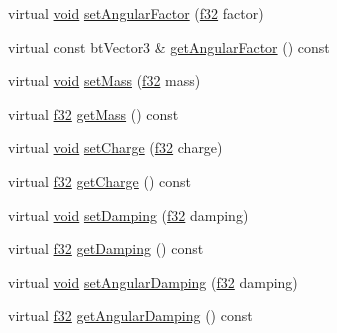 \begin{DoxyCompactItemize}
\item 
virtual \mbox{\hyperlink{_thread_8h_af1e856da2e658414cb2456cb6f7ebc66}{void}} \mbox{\hyperlink{classnjli_1_1_physics_body_rigid_a20c0ae6e0bc489646c4d3206fdda2662}{set\+Angular\+Factor}} (\mbox{\hyperlink{_util_8h_a5f6906312a689f27d70e9d086649d3fd}{f32}} factor)
\item 
virtual const bt\+Vector3 \& \mbox{\hyperlink{classnjli_1_1_physics_body_rigid_a2c2f3087ebc43b32ceb3fdb13935fcca}{get\+Angular\+Factor}} () const
\item 
virtual \mbox{\hyperlink{_thread_8h_af1e856da2e658414cb2456cb6f7ebc66}{void}} \mbox{\hyperlink{classnjli_1_1_physics_body_rigid_a1c8b45c013666e4cd575fc6e3c6db031}{set\+Mass}} (\mbox{\hyperlink{_util_8h_a5f6906312a689f27d70e9d086649d3fd}{f32}} mass)
\item 
virtual \mbox{\hyperlink{_util_8h_a5f6906312a689f27d70e9d086649d3fd}{f32}} \mbox{\hyperlink{classnjli_1_1_physics_body_rigid_a91e536e02eac21b097654263c6298f1b}{get\+Mass}} () const
\item 
virtual \mbox{\hyperlink{_thread_8h_af1e856da2e658414cb2456cb6f7ebc66}{void}} \mbox{\hyperlink{classnjli_1_1_physics_body_rigid_a620b7e704797642da0594762ff24a0b8}{set\+Charge}} (\mbox{\hyperlink{_util_8h_a5f6906312a689f27d70e9d086649d3fd}{f32}} charge)
\item 
virtual \mbox{\hyperlink{_util_8h_a5f6906312a689f27d70e9d086649d3fd}{f32}} \mbox{\hyperlink{classnjli_1_1_physics_body_rigid_acbf656bd51d8b91a3795a615eb364f9c}{get\+Charge}} () const
\item 
virtual \mbox{\hyperlink{_thread_8h_af1e856da2e658414cb2456cb6f7ebc66}{void}} \mbox{\hyperlink{classnjli_1_1_physics_body_rigid_a18a20381b14bf38c1dd731a9e25fc278}{set\+Damping}} (\mbox{\hyperlink{_util_8h_a5f6906312a689f27d70e9d086649d3fd}{f32}} damping)
\item 
virtual \mbox{\hyperlink{_util_8h_a5f6906312a689f27d70e9d086649d3fd}{f32}} \mbox{\hyperlink{classnjli_1_1_physics_body_rigid_ac9d68b1764effd8b44c48559705fbcd1}{get\+Damping}} () const
\item 
virtual \mbox{\hyperlink{_thread_8h_af1e856da2e658414cb2456cb6f7ebc66}{void}} \mbox{\hyperlink{classnjli_1_1_physics_body_rigid_a9cf475f63ddb4962e95dc47d2f0bc8c5}{set\+Angular\+Damping}} (\mbox{\hyperlink{_util_8h_a5f6906312a689f27d70e9d086649d3fd}{f32}} damping)
\item 
virtual \mbox{\hyperlink{_util_8h_a5f6906312a689f27d70e9d086649d3fd}{f32}} \mbox{\hyperlink{classnjli_1_1_physics_body_rigid_ab6d50a3ae1ec1756ed4d530bf7a4a9d4}{get\+Angular\+Damping}} () const

\end{DoxyCompactItemize}
